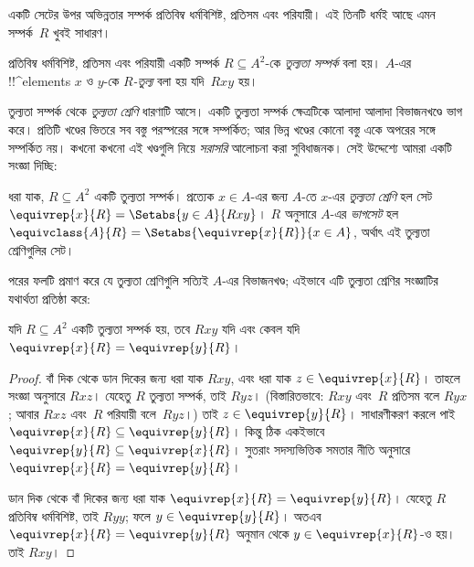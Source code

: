 \documentclass[../../../include/open-logic-section]{subfiles}
\begin{document}


একটি সেটের উপর অভিন্নতার সম্পর্ক প্রতিবিম্ব ধর্মবিশিষ্ট, প্রতিসম এবং পরিযায়ী। এই তিনটি ধর্মই আছে এমন সম্পর্ক~$R$ খুবই সাধারণ।

\begin{defn}[তুল্যতা সম্পর্ক]
প্রতিবিম্ব ধর্মবিশিষ্ট, প্রতিসম এবং পরিযায়ী একটি সম্পর্ক $R \subseteq A^2$-কে \emph{তুল্যতা সম্পর্ক} বলা হয়। $A$-এর !!^{element}s $x$ ও $y$-কে \emph{$R$-তুল্য} বলা হয় যদি~$Rxy$ হয়।
\end{defn}

তুল্যতা সম্পর্ক থেকে \emph{তুল্যতা শ্রেণি} ধারণাটি আসে। একটি তুল্যতা সম্পর্ক ক্ষেত্রটিকে আলাদা আলাদা বিভাজনখণ্ডে ভাগ করে। প্রতিটি খণ্ডের ভিতরে সব বস্তু পরস্পরের সঙ্গে সম্পর্কিত; আর ভিন্ন খণ্ডের কোনো বস্তু একে অপরের সঙ্গে সম্পর্কিত নয়। কখনো কখনো এই খণ্ডগুলি নিয়ে \emph{সরাসরি} আলোচনা করা সুবিধাজনক। সেই উদ্দেশ্যে আমরা একটি সংজ্ঞা দিচ্ছি:

\begin{defn}
ধরা যাক, $R \subseteq A^2$ একটি তুল্যতা সম্পর্ক। প্রত্যেক $x \in A$-এর জন্য $A$-তে $x$-এর \emph{তুল্যতা শ্রেণি} হল সেট $\equivrep{x}{R} = \Setabs{y \in A}{Rxy}$। $R$ অনুসারে $A$-এর \emph{ভাগসেট} হল $\equivclass{A}{R} = \Setabs{\equivrep{x}{R}}{x \in A}$, অর্থাৎ এই তুল্যতা শ্রেণিগুলির সেট।
\end{defn}

পরের ফলটি প্রমাণ করে যে তুল্যতা শ্রেণিগুলি সত্যিই $A$-এর বিভাজনখণ্ড; এইভাবে এটি তুল্যতা শ্রেণির সংজ্ঞাটির যথার্থতা প্রতিষ্ঠা করে:

\begin{prop}
যদি $R \subseteq A^2$ একটি তুল্যতা সম্পর্ক হয়, তবে $Rxy$ যদি এবং কেবল যদি $\equivrep{x}{R} = \equivrep{y}{R}$।
\end{prop}

\begin{proof}
বাঁ দিক থেকে ডান দিকের জন্য ধরা যাক $Rxy$, এবং ধরা যাক $z \in \equivrep{x}{R}$। তাহলে সংজ্ঞা অনুসারে $Rxz$। যেহেতু $R$ তুল্যতা সম্পর্ক, তাই $Ryz$। (বিস্তারিতভাবে: $Rxy$ এবং~$R$ প্রতিসম বলে $Ryx$; আবার $Rxz$ এবং~$R$ পরিযায়ী বলে~$Ryz$।) তাই $z \in \equivrep{y}{R}$। সাধারণীকরণ করলে পাই $\equivrep{x}{R} \subseteq \equivrep{y}{R}$। কিন্তু ঠিক একইভাবে $\equivrep{y}{R} \subseteq \equivrep{x}{R}$। সুতরাং সদস্যভিত্তিক সমতার নীতি অনুসারে $\equivrep{x}{R} = \equivrep{y}{R}$।

ডান দিক থেকে বাঁ দিকের জন্য ধরা যাক $\equivrep{x}{R} = \equivrep{y}{R}$। যেহেতু $R$ প্রতিবিম্ব ধর্মবিশিষ্ট, তাই $Ryy$; ফলে $y \in \equivrep{y}{R}$। অতএব $\equivrep{x}{R} = \equivrep{y}{R}$ অনুমান থেকে $y \in \equivrep{x}{R}$-ও হয়। তাই $Rxy$।
\end{proof}
\end{document}
